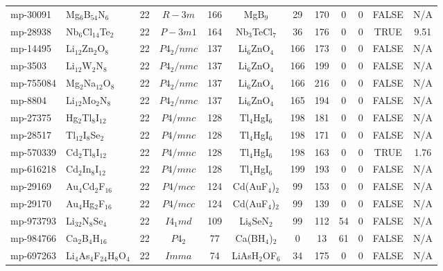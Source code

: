 {\begin{longtable}{llcccccccccc}
    mp-30091 & Mg$_{6}$B$_{54}$N$_{6}$ & 22    & $R-3m$ & 166   & MgB$_{9}$ & 29    & 170   & 0     & 0     & FALSE & N/A \\
    mp-28938 & Nb$_{6}$Cl$_{14}$Te$_{2}$ & 22    & $P-3m1$ & 164   & Nb$_{3}$TeCl$_{7}$ & 36    & 176   & 0     & 0     & TRUE  & 9.51  \\
    mp-14495 & Li$_{12}$Zn$_{2}$O$_{8}$ & 22    & $P4_2/nmc$ & 137   & Li$_{6}$ZnO$_{4}$ & 166   & 173   & 0     & 0     & FALSE & N/A \\
    mp-3503 & Li$_{12}$W$_{2}$N$_{8}$ & 22    & $P4_2/nmc$ & 137   & Li$_{6}$ZnO$_{4}$ & 166   & 199   & 0     & 0     & FALSE & N/A \\
    mp-755084 & Mg$_{2}$Na$_{12}$O$_{8}$ & 22    & $P4_2/nmc$ & 137   & Li$_{6}$ZnO$_{4}$ & 166   & 216   & 0     & 0     & FALSE & N/A \\
    mp-8804 & Li$_{12}$Mo$_{2}$N$_{8}$ & 22    & $P4_2/nmc$ & 137   & Li$_{6}$ZnO$_{4}$ & 165   & 194   & 0     & 0     & FALSE & N/A \\
    mp-27375 & Hg$_{2}$Tl$_{8}$I$_{12}$ & 22    & $P4/mnc$ & 128   & Tl$_{4}$HgI$_{6}$ & 198   & 181   & 0     & 0     & FALSE & N/A \\
    mp-28517 & Tl$_{12}$I$_{8}$Se$_{2}$ & 22    & $P4/mnc$ & 128   & Tl$_{4}$HgI$_{6}$ & 198   & 171   & 0     & 0     & FALSE & N/A \\
    mp-570339 & Cd$_{2}$Tl$_{8}$I$_{12}$ & 22    & $P4/mnc$ & 128   & Tl$_{4}$HgI$_{6}$ & 198   & 163   & 0     & 0     & TRUE  & 1.76  \\
    mp-616218 & Cd$_{2}$In$_{8}$I$_{12}$ & 22    & $P4/mnc$ & 128   & Tl$_{4}$HgI$_{6}$ & 199   & 193   & 0     & 0     & FALSE & N/A \\
    mp-29169 & Au$_{4}$Cd$_{2}$F$_{16}$ & 22    & $P4/mcc$ & 124   & Cd(AuF$_{4}$)$_{2}$ & 99    & 153   & 0     & 0     & FALSE & N/A \\
    mp-29170 & Au$_{4}$Hg$_{2}$F$_{16}$ & 22    & $P4/mcc$ & 124   & Cd(AuF$_{4}$)$_{2}$ & 99    & 139   & 0     & 0     & FALSE & N/A \\
    mp-973793 & Li$_{32}$N$_{8}$Se$_{4}$ & 22    & $I4_1md$ & 109   & Li$_{8}$SeN$_{2}$ & 99    & 112   & 54    & 0     & FALSE & N/A \\
    mp-984766 & Ca$_{2}$B$_{4}$H$_{16}$ & 22    & $P4_2$ & 77    & Ca(BH$_{4}$)$_{2}$ & 0     & 13    & 61    & 0     & FALSE & N/A \\
    mp-697263 & Li$_{4}$As$_{4}$F$_{24}$H$_{8}$O$_{4}$ & 22    & $Imma$ & 74    & LiAsH$_{2}$OF$_{6}$ & 34    & 175   & 0     & 0     & FALSE & N/A \\

\end{longtable}}
